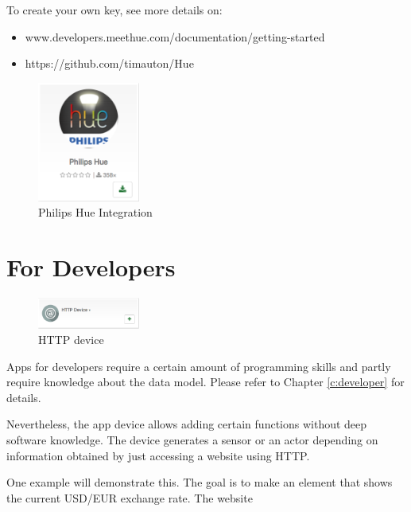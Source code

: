 To create your own key, see more details on:
\begin{itemize}
\item www.developers.meethue.com/documentation/getting-started
\item https://github.com/timauton/Hue
\end{itemize}
\begin{figure}
\begin{center}
\includegraphics[width=0.3\textwidth]{pngs/cap6/app44.png}
\caption{Philips Hue Integration}
\label{app44}
\end{center}
\end{figure}


\section{For Developers}

\begin{figure}
\begin{center}
\includegraphics[width=0.3\textwidth]{pngs/cap6/app28.png}
\caption{HTTP device}
\label{app28}
\end{center}
\end{figure}

Apps for developers require a certain amount of programming skills and partly require 
knowledge about the \zway data model. Please refer to Chapter \ref{c:developer} for details.

Nevertheless, the app  device allows adding certain functions without deep 
software knowledge. The  device generates a sensor or an actor depending on 
information obtained by just accessing a website using HTTP.

One example will demonstrate this. The goal is to make an element that shows the current 
USD/EUR exchange rate. The website 


